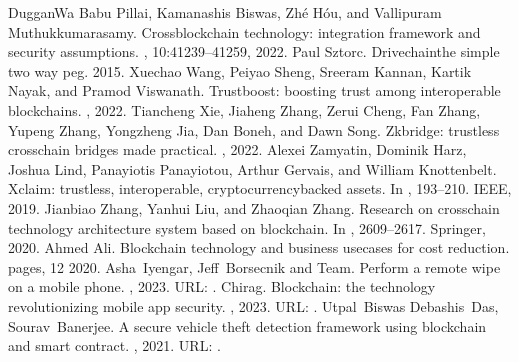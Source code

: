 \documentclass[letterpaper,10pt,english]{jupyterBook}
\begin{document}
\begin{sphinxthebibliography}{DugganWa}
\sphinxAtStartPar
Babu Pillai, Kamanashis Biswas, Zhé Hóu, and Vallipuram Muthukkumarasamy. Cross\sphinxhyphen{}blockchain technology: integration framework and security assumptions. , 10:41239–41259, 2022.
\sphinxAtStartPar
Paul Sztorc. Drivechain\sphinxhyphen{}the simple two way peg. 2015.
\sphinxAtStartPar
Xuechao Wang, Peiyao Sheng, Sreeram Kannan, Kartik Nayak, and Pramod Viswanath. Trustboost: boosting trust among interoperable blockchains. , 2022.
\sphinxAtStartPar
Tiancheng Xie, Jiaheng Zhang, Zerui Cheng, Fan Zhang, Yupeng Zhang, Yongzheng Jia, Dan Boneh, and Dawn Song. Zkbridge: trustless cross\sphinxhyphen{}chain bridges made practical. , 2022.
\sphinxAtStartPar
Alexei Zamyatin, Dominik Harz, Joshua Lind, Panayiotis Panayiotou, Arthur Gervais, and William Knottenbelt. Xclaim: trustless, interoperable, cryptocurrency\sphinxhyphen{}backed assets. In , 193–210. IEEE, 2019.
\sphinxAtStartPar
Jianbiao Zhang, Yanhui Liu, and Zhaoqian Zhang. Research on cross\sphinxhyphen{}chain technology architecture system based on blockchain. In , 2609–2617. Springer, 2020.
\sphinxAtStartPar
Ahmed Ali. Blockchain technology and business use\sphinxhyphen{}cases for cost reduction. pages, 12 2020.
\sphinxAtStartPar
Asha Iyengar, Jeff Borsecnik and Team. Perform a remote wipe on a mobile phone. , 2023. URL: .
\sphinxAtStartPar
Chirag. Blockchain: the technology revolutionizing mobile app security. , 2023. URL: .
\sphinxAtStartPar
Utpal Biswas Debashis Das, Sourav Banerjee. A secure vehicle theft detection framework using blockchain and smart contract. , 2021. URL: .

\end{sphinxthebibliography}
\end{document}
